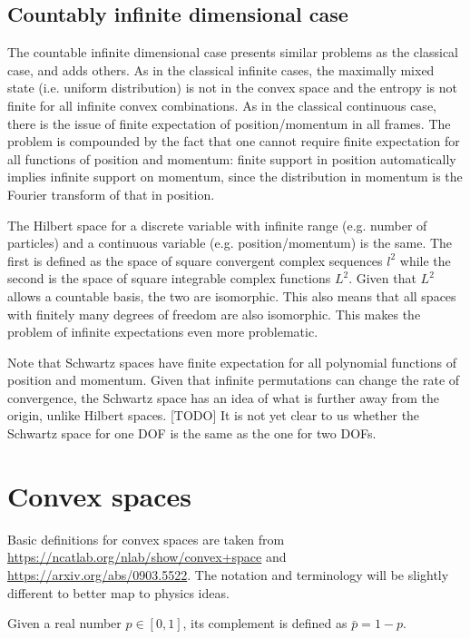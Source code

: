\subsection{Countably infinite dimensional case}

The countable infinite dimensional case presents similar problems as the classical case, and adds others. As in the classical infinite cases, the maximally mixed state (i.e. uniform distribution) is not in the convex space and the entropy is not finite for all infinite convex combinations. As in the classical continuous case, there is the issue of finite expectation of position/momentum in all frames. The problem is compounded by the fact that one cannot require finite expectation for all functions of position and momentum: finite support in position automatically implies infinite support on momentum, since the distribution in momentum is the Fourier transform of that in position.

The Hilbert space for a discrete variable with infinite range (e.g. number of particles) and a continuous variable (e.g. position/momentum) is the same. The first is defined as the space of square convergent complex sequences $l^2$ while the second is the space of square integrable complex functions $L^2$. Given that $L^2$ allows a countable basis, the two are isomorphic. This also means that all spaces with finitely many degrees of freedom are also isomorphic. This makes the problem of infinite expectations even more problematic.

Note that Schwartz spaces have finite expectation for all polynomial functions of position and momentum. Given that infinite permutations can change the rate of convergence, the Schwartz space has an idea of what is further away from the origin, unlike Hilbert spaces. [TODO] It is not yet clear to us whether the Schwartz space for one DOF is the same as the one for two DOFs.

\section{Convex spaces}

Basic definitions for convex spaces are taken from \url{https://ncatlab.org/nlab/show/convex+space} and \url{https://arxiv.org/abs/0903.5522}. The notation and terminology will be slightly different to better map to physics ideas. 

\begin{defn}
	Given a real number $p \in [0,1]$, its complement is defined as $\bar{p} = 1-p$.
\end{defn}

